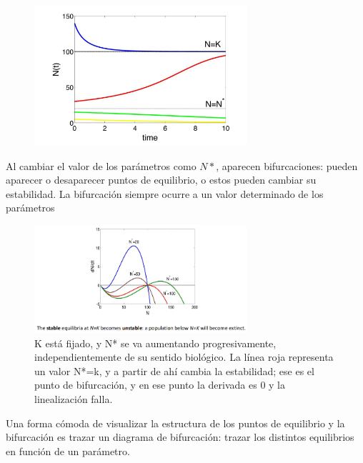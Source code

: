 \begin{figure}[h]
\centering
\includegraphics[width = 0.7\textwidth]{figs/bistability.png}
\end{figure}

Al cambiar el valor de los parámetros como $N*$, aparecen bifurcaciones: pueden aparecer o desaparecer puntos de equilibrio, o estos pueden cambiar su estabilidad. La bifurcación siempre ocurre a un valor determinado de los parámetros

\begin{figure}[h]
\centering
\includegraphics[width = 0.7\textwidth]{figs/bistability-bifurcations.png}
\caption{K está fijado, y N* se va aumentando progresivamente, independientemente de su sentido biológico. La línea roja representa un valor N*=k, y a partir de ahí cambia la estabilidad; ese es el punto de bifurcación, y en ese punto la derivada es 0 y la linealización falla.}
\end{figure}

Una forma cómoda de visualizar la estructura de los puntos de equilibrio y la bifurcación es trazar un diagrama de bifurcación: trazar los distintos equilibrios en función de un parámetro.


